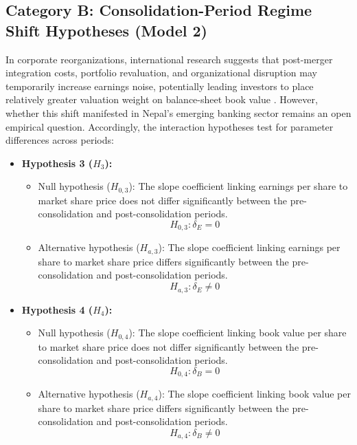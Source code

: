\subsection{Category B: Consolidation-Period Regime Shift Hypotheses (Model 2)}
In corporate reorganizations, international research suggests that post-merger integration costs, portfolio revaluation, and organizational disruption may temporarily increase earnings noise, potentially leading investors to place relatively greater valuation weight on balance-sheet book value \citep{kwon2020}. However, whether this shift manifested in Nepal's emerging banking sector remains an open empirical question. Accordingly, the interaction hypotheses test for parameter differences across periods:
\begin{itemize}
\item \textbf{Hypothesis 3 ($H_3$):}
\begin{itemize}
\item Null hypothesis ($H_{0,3}$): The slope coefficient linking earnings per share to market share price does not differ significantly between the pre-consolidation and post-consolidation periods.
\begin{equation}
H_{0,3}: \delta_E = 0
\end{equation}
\item Alternative hypothesis ($H_{a,3}$): The slope coefficient linking earnings per share to market share price differs significantly between the pre-consolidation and post-consolidation periods.
\begin{equation}
H_{a,3}: \delta_E \ne 0
\end{equation}
\end{itemize}

\item \textbf{Hypothesis 4 ($H_4$):}
\begin{itemize}
\item Null hypothesis ($H_{0,4}$): The slope coefficient linking book value per share to market share price does not differ significantly between the pre-consolidation and post-consolidation periods.
\begin{equation}
H_{0,4}: \delta_B = 0
\end{equation}
\item Alternative hypothesis ($H_{a,4}$): The slope coefficient linking book value per share to market share price differs significantly between the pre-consolidation and post-consolidation periods.
\begin{equation}
H_{a,4}: \delta_B \ne 0
\end{equation}
\end{itemize}
\end{itemize}

